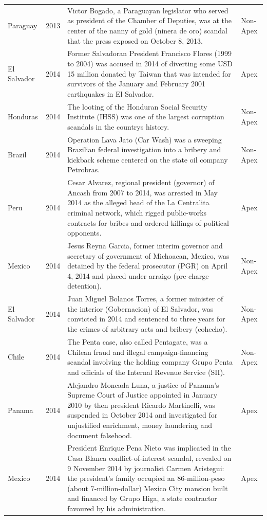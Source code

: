 \begin{landscape}
\begin{longtable}{@{}l c p{15.5cm} l@{}}
Paraguay & 2013 & Victor Bogado, a Paraguayan legislator who served as president of the Chamber of Deputies, was at the center of the nanny of gold (ninera de oro) scandal that the press exposed on October 8, 2013. & Non-Apex \\
El Salvador & 2014 & Former Salvadoran President Francisco Flores (1999 to 2004) was accused in 2014 of diverting some USD 15 million donated by Taiwan that was intended for survivors of the January and February 2001 earthquakes in El Salvador. & Apex \\
Honduras & 2014 & The looting of the Honduran Social Security Institute (IHSS) was one of the largest corruption scandals in the countrys history. & Non-Apex \\
Brazil & 2014 & Operation Lava Jato (Car Wash) was a sweeping Brazilian federal investigation into a bribery and kickback scheme centered on the state oil company Petrobras. & Non-Apex \\
Peru & 2014 & Cesar Alvarez, regional president (governor) of Ancash from 2007 to 2014, was arrested in May 2014 as the alleged head of the La Centralita criminal network, which rigged public-works contracts for bribes and ordered killings of political opponents. & Apex \\
Mexico & 2014 & Jesus Reyna Garcia, former interim governor and secretary of government of Michoacan, Mexico, was detained by the federal prosecutor (PGR) on April 4, 2014 and placed under arraigo (pre-charge detention). & Non-Apex \\
El Salvador & 2014 & Juan Miguel Bolanos Torres, a former minister of the interior (Gobernacion) of El Salvador, was convicted in 2014 and sentenced to three years for the crimes of arbitrary acts and bribery (cohecho). & Non-Apex \\
Chile & 2014 & The Penta case, also called Pentagate, was a Chilean fraud and illegal campaign-financing scandal involving the holding company Grupo Penta and officials of the Internal Revenue Service (SII). & Non-Apex \\
Panama & 2014 & Alejandro Moncada Luna, a justice of Panama's Supreme Court of Justice appointed in January 2010 by then president Ricardo Martinelli, was suspended in October 2014 and investigated for unjustified enrichment, money laundering and document falsehood. & Apex \\
Mexico & 2014 & President Enrique Pena Nieto was implicated in the Casa Blanca conflict-of-interest scandal, revealed on 9 November 2014 by journalist Carmen Aristegui: the president's family occupied an 86-million-peso (about 7-million-dollar) Mexico City mansion built and financed by Grupo Higa, a state contractor favoured by his administration. & Apex \\

\end{longtable}
\end{landscape}
